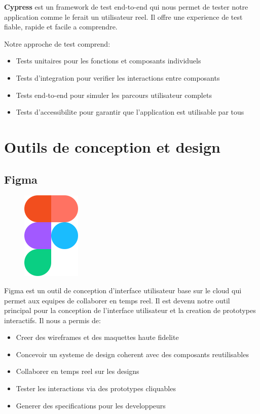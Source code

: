 \textbf{Cypress} est un framework de test end-to-end qui nous permet de tester notre application comme le ferait un utilisateur reel. Il offre une experience de test fiable, rapide et facile a comprendre.

Notre approche de test comprend:
\begin{itemize}
    \item Tests unitaires pour les fonctions et composants individuels
    \item Tests d'integration pour verifier les interactions entre composants
    \item Tests end-to-end pour simuler les parcours utilisateur complets
    \item Tests d'accessibilite pour garantir que l'application est utilisable par tous
\end{itemize}

\section{Outils de conception et design}

\subsection{Figma}
\begin{figure}
    \centering
    \includegraphics[width=0.25\textwidth]{assets/docs/figma.png}
\end{figure}
Figma est un outil de conception d'interface utilisateur base sur le cloud qui permet aux equipes de collaborer en temps reel. Il est devenu notre outil principal pour la conception de l'interface utilisateur et la creation de prototypes interactifs. Il nous a permis de:

\begin{itemize}
    \item Creer des wireframes et des maquettes haute fidelite
    \item Concevoir un systeme de design coherent avec des composants reutilisables
    \item Collaborer en temps reel sur les designs
    \item Tester les interactions via des prototypes cliquables
    \item Generer des specifications pour les developpeurs
\end{itemize}

